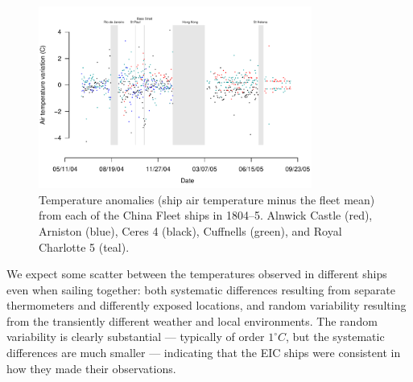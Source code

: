 \documentclass[CP]{copernicus}
\begin{document}
\begin{figure}[!hbp]
\begin{center}
\includegraphics[angle=0, width=0.8\textwidth]{./../../../analysis/south_pacific/figures/temperature_v_time}
\caption{Temperature anomalies (ship air temperature minus the fleet mean) from each of the China Fleet ships in 1804--5. Alnwick Castle (red), Arniston (blue), Ceres 4 (black), Cuffnells (green), and Royal Charlotte 5 (teal).}
\label{pf3}
\end{center}
\end{figure}
We expect some scatter between the temperatures observed in different ships even when sailing together: both systematic differences resulting from separate thermometers and differently exposed locations, and random variability resulting from the transiently different weather and local environments. The random variability is clearly substantial --- typically of order $1^\circ C$, but the systematic differences are much smaller --- indicating that the EIC ships were consistent in how they made their observations.
\end{document}
